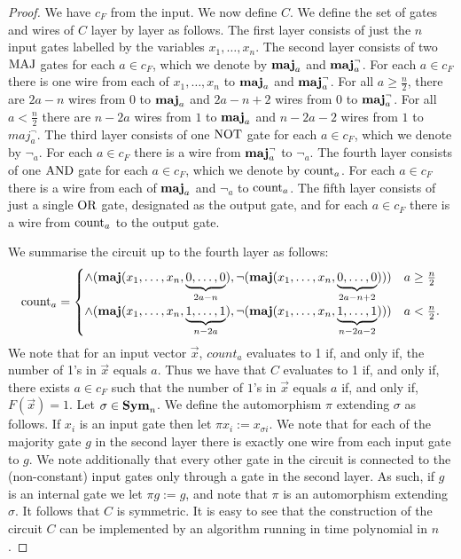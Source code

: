\documentclass[../main/thesis.tex]{subfiles}
\begin{document}
\begin{proof}
  We have $c_{F}$ from the input. We now define $C$. We define the set of gates
  and wires of $C$ layer by layer as follows. The first layer consists of just
  the $n$ input gates labelled by the variables $x_1, \ldots , x_n$. The second
  layer consists of two $\text{\upshape MAJ}$ gates for each $a \in c_{F}$, which we denote by
  $\text{\textbf{maj}}_a$ and $\text{\textbf{maj}}^{\neg}_a$. For each $a \in c_{F}$ there is one wire from
  each of $x_1, \ldots , x_n$ to $\text{\textbf{maj}}_a$ and $\text{\textbf{maj}}^{\neg}_a$. For all $a \geq
  \frac{n}{2}$, there are $2a - n$ wires from $0$ to $\text{\textbf{maj}}_a$ and $2a - n + 2$
  wires from $0$ to $\text{\textbf{maj}}^{\neg}_a$. For all $a < \frac{n}{2}$ there are $n -
  2a$ wires from $1$ to $\text{\textbf{maj}}_a$ and $n - 2a - 2$ wires from $1$ to
  $maj^{\neg}_a$. The third layer consists of one $\text{\upshape NOT}$ gate for each $a \in
  c_{F}$, which we denote by $\neg_a$. For each $a \in c_{F}$ there is a wire
  from $\text{\textbf{maj}}^\neg_a$ to $\neg_a$. The fourth layer consists of one $\text{\upshape AND}$ gate
  for each $a \in c_{F}$, which we denote by $\text{count}_a$. For each $a \in
  c_{F}$ there is a wire from each of $\text{\textbf{maj}}_a$ and $\neg_a$ to $\text{count}_a$.
  The fifth layer consists of just a single $\text{\upshape OR}$ gate, designated as the output
  gate, and for each $a \in c_{F}$ there is a wire from $\text{count}_a$ to the
  output gate.

  We summarise the circuit up to the fourth layer as follows:
  \[
    \text{count}_a = \begin{cases} \land ( \text{\textbf{maj}} ( x_1, \ldots, x_n, \underbrace
      {0, \ldots, 0}_{2a - n} ), \neg ( \text{\textbf{maj}} (x_1, \ldots , x_n, \underbrace{0,
        \ldots,
        0}_{2a - n + 2} ) )) &  a \geq \frac{n}{2} \\
      \land ( \text{\textbf{maj}} ( x_1, \ldots, x_n, \underbrace {1, \ldots, 1}_{n - 2a} ),
      \neg ( \text{\textbf{maj}} ( x_1, \ldots , x_n, \underbrace{1, \ldots, 1}_{n - 2a -2} )
      )) & a < \frac{n}{2}.
    \end{cases}
  \]
  We note that for an input vector $\vec{x}$, $count_a$ evaluates to 1 if, and
  only if, the number of 1's in $\vec{x}$ equals $a$. Thus we have that $C$
  evaluates to 1 if, and only if, there exists $a \in c_{F}$ such that the
  number of $1$'s in $\vec{x}$ equals $a$ if, and only if, $F (\vec{x}) = 1$.
  Let $\sigma \in \text{\textbf{Sym}}_n$. We define the automorphism $\pi$ extending $\sigma$
  as follows. If $x_i$ is an input gate then let $\pi x_i := x_{\sigma i}$. We
  note that for each of the majority gate $g$ in the second layer there is
  exactly one wire from each input gate to $g$. We note additionally that every
  other gate in the circuit is connected to the (non-constant) input gates only
  through a gate in the second layer. As such, if $g$ is an internal gate we let
  $\pi g := g$, and note that $\pi$ is an automorphism extending $\sigma$. It
  follows that $C$ is symmetric. It is easy to see that the construction of the
  circuit $C$ can be implemented by an algorithm running in time polynomial in
  $n$.


\end{proof}
\end{document}
